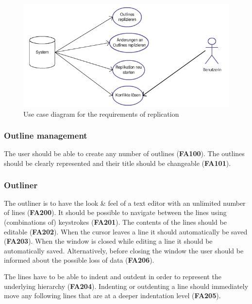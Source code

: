 \medskip
\begin{figure}[ht] 
  \begin{center}
  \includegraphics[width=\textwidth]{grafik/usecasediagramm-muss-repl} 
  \end{center}
  \caption{Use case diagram for the requirements of replication}
  \label{fig:usecasediagramm-muss-repl} 
\end{figure}

\subsubsection{Outline management}

The user should be able to create any number of outlines (\textbf{FA100}). The outlines should be clearly represented and their title should be changeable (\textbf{FA101}). 

\subsubsection{Outliner}
\label{subsec:gliederungseditor}

The outliner is to have the look \& feel of a text editor with an unlimited number of lines (\textbf{FA200}). It should be possible to navigate between the lines using (combinations of) keystrokes (\textbf{FA201}). The contents of the lines should be editable (\textbf{FA202}). When the cursor leaves a line it should automatically be saved (\textbf{FA203}). When the window is closed while editing a line it should be automatically saved. Alternatively, before closing the window the user should be informed about the possible loss of data (\textbf{FA206}).

The lines have to be able to indent and outdent in order to represent the underlying hierarchy (\textbf{FA204}). Indenting or outdenting a line should immediately move any following lines that are at a deeper indentation level (\textbf{FA205}).

